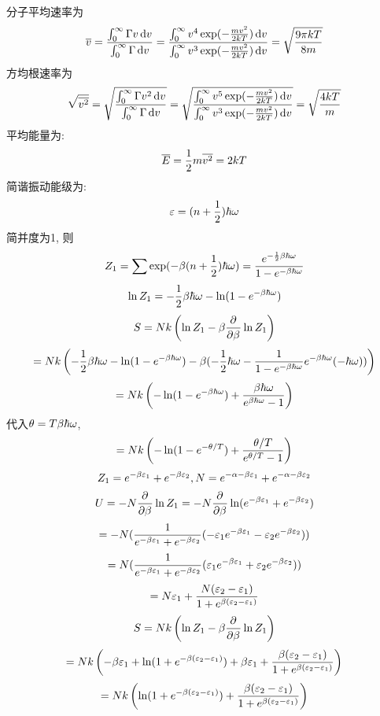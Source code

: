 \documentclass[UTF8,9pt]{ctexart}
\begin{document}
分子平均速率为
$$\bar{v} =\f{\intzi \Gamma v\d v}{\intzi \Gamma \d v} = \f{\intzi v^4\exp(-\f{mv^2}{2kT}) \d v}{\intzi v^3\exp(-\f{mv^2}{2kT}) \d v} = \sqrt{\f{9\pi kT}{8m}}$$
方均根速率为
$$\sqrt{\bar{v^2}} =\sqrt{\f{\intzi \Gamma v^2\d v}{\intzi \Gamma \d v}} = \sqrt{\f{\intzi v^5\exp(-\f{mv^2}{2kT}) \d v}{\intzi v^3\exp(-\f{mv^2}{2kT}) \d v}} = \sqrt{\f{4 kT}{m}}$$
平均能量为: 
$$\bar{E} = \ff{2}m\bar{v^2} = 2kT$$
简谐振动能级为: 
$$\ep = (n+\ff{2})\hbar \o $$
简并度为1, 则
$$Z_1 = \sum \exp(-\b(n+\ff{2})\hbar \o) = \f{e^{-\ff{2}\b\hbar\o}}{1-e^{-\b\hbar\o}}$$
$$\ln Z_1 = -\ff{2}\b\hbar\o -\ln(1-e^{-\b\hbar\o})$$
$$S = Nk\of{\ln Z_1 -\b\pp{}{\b}\ln Z_1}$$
$$ = Nk\of{ -\ff{2}\b\hbar\o -\ln(1-e^{-\b\hbar\o})   -\b (-\ff{2}\hbar\o-\ff{1-e^{-\b\hbar\o}}e^{-\b\hbar\o}(-\hbar\o))}$$
$$ = Nk\of{-\ln(1-e^{-\b\hbar\o})  + \f{\b\hbar\o}{e^{\b\hbar\o}-1}}$$
代入$\t = T\b\hbar\o$,
$$ = Nk\of{-\ln(1-e^{-\t/T}) +\f{\t/T}{e^{\t/T}-1}}$$
$$Z_1 = e^{-\b \ep_1} + e^{-\b \ep_2}, N =e^{-\a-\b \ep_1} + e^{-\a-\b \ep_2}$$
$$U = -N\pp{}{\b}\ln Z_1 = -N\pp{}{\b}\ln(e^{-\b \ep_1} + e^{-\b \ep_2})$$
$$ = -N(\ff{e^{-\b \ep_1} + e^{-\b \ep_2}}(-\ep_1e^{-\b \ep_1} -\ep_2e^{-\b \ep_2}))$$
$$ = N(\ff{e^{-\b \ep_1} + e^{-\b \ep_2}}(\ep_1e^{-\b \ep_1} + \ep_2e^{-\b \ep_2}))$$
$$ = N\ep_1+\f{N(\ep_2-\ep_1)}{1+e^{\b(\ep_2-\ep_1)}}$$
$$S = Nk\of{\ln Z_1 -\b\pp{}{\b}\ln Z_1}$$
$$=Nk\of{-\b\ep_1+\ln(1+e^{-\b(\ep_2-\ep_1)})  +\b\ep_1+\f{\b(\ep_2-\ep_1)}{1+e^{\b(\ep_2-\ep_1)}}}$$
$$=Nk\of{\ln(1+e^{-\b(\ep_2-\ep_1)})  +\f{\b(\ep_2-\ep_1)}{1+e^{\b(\ep_2-\ep_1)}}}$$
\end{document}

